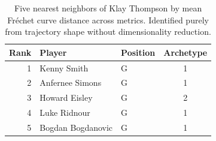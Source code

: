 \begin{table}[htbp]
  \centering\small
  \begin{tabular}{rllc}
    \toprule
    Rank & Player & Position & Archetype \\
    \midrule
    1 & Kenny Smith & G & 1 \\
    2 & Anfernee Simons & G & 1 \\
    3 & Howard Eisley & G & 2 \\
    4 & Luke Ridnour & G & 1 \\
    5 & Bogdan Bogdanovic & G & 1 \\
    \bottomrule
  \end{tabular}
  \caption{Five nearest neighbors of Klay Thompson by mean Fr\'{e}chet curve distance across metrics. Identified purely from trajectory shape without dimensionality reduction.}
  \label{tab:Klay_Thompson_frechet_curve_neighbors}
\end{table}

